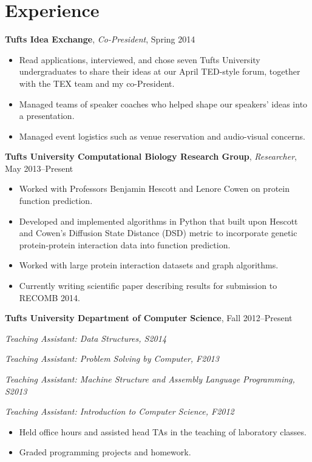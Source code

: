 \vspace{-15pt}
\section*{Experience}
{\bf Tufts Idea Exchange}, {\em Co-President}, Spring 2014\\
\vspace*{-.15in}
\begin{itemize}[topsep=0pt, itemsep=1pt]
  \item Read applications, interviewed, and chose seven Tufts University undergraduates to share their ideas at our April TED-style forum, together with the TEX team and my co-President.
  \item Managed teams of speaker coaches who helped shape our speakers' ideas into a presentation.
  \item Managed event logistics such as venue reservation and audio-visual concerns.
\end{itemize}
\vspace{6pt}
{\bf Tufts University Computational Biology Research Group}, {\em Researcher}, May 2013--Present\\
\vspace*{-.15in} 
\begin{itemize}[topsep=0pt,itemsep=-1pt]
    \item Worked with Professors Benjamin Hescott and Lenore Cowen on protein function prediction.
    \item Developed and implemented algorithms in Python that built upon Hescott and Cowen's Diffusion State Distance (DSD) metric to incorporate genetic protein-protein interaction data into function prediction.
    \item Worked with large protein interaction datasets and graph algorithms.
    \item Currently writing scientific paper describing results for submission to RECOMB 2014.
\end{itemize}
\vspace{6pt}
{\bf Tufts University Department of Computer Science}, Fall 2012--Present\\
\vspace*{-.15in}
\begin{list1}
\item [] {\em Teaching Assistant: Data Structures, S2014}
\item [] {\em Teaching Assistant: Problem Solving by Computer, F2013}
\item [] {\em Teaching Assistant: Machine Structure and Assembly Language Programming, S2013}
\item [] {\em Teaching Assistant: Introduction to Computer Science, F2012}
\item [] {\begin{itemize}[topsep=0pt,itemsep=-1pt]
    \item Held office hours and assisted head TAs in the teaching of laboratory classes.
    \item Graded programming projects and homework.
\end{itemize}}
\end{list1}
